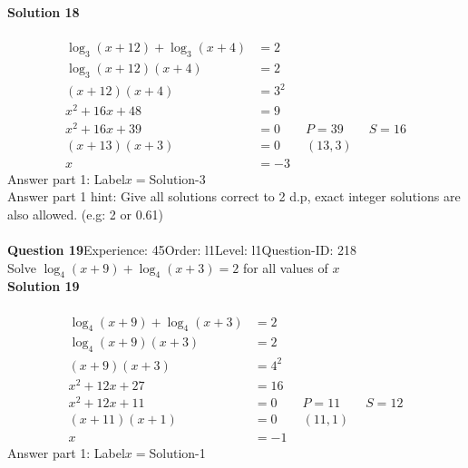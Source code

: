\documentclass{article}
\begin{document}
\noindent\textbf{Solution 18}\\[2pt]
\\[-35pt]\begin{align*}
\log_{3}(x+12)+\log_{3}(x+4)&=2\\[2pt]
\log_{3}(x+12)(x+4)&=2\\[2pt]
(x+12)(x+4)&=3^2\\[2pt]
x^2+16x+48&=9\\[2pt]
x^2+16x+39&=0\qquad P=39 \qquad S=16\\[2pt]
(x+13)(x+3)&=0\qquad (13,3)\\[2pt]
x&=-3
\end{align*}
Answer part 1: \hspace{10pt}Label\hspace{10pt}$x=$\hspace{10pt}Solution\hspace{10pt}-3\\
Answer part 1 hint: \hspace{15pt} Give all solutions correct to 2 d.p, exact integer solutions are also allowed. (e.g: 2 or 0.61)\\
\\[4pt]
\noindent\textbf{Question 19}\hspace{20pt}Experience: 45\hspace{20pt}Order: l1\hspace{20pt}Level: l1\hspace{20pt}Question-ID: 218\\[2pt]
Solve $\log_{4}(x+9)+\log_{4}(x+3)=2$ for all values of $x$\\[4pt]
\noindent\textbf{Solution 19}\\[2pt]
\\[-35pt]\begin{align*}
\log_{4}(x+9)+\log_{4}(x+3)&=2\\[2pt]
\log_{4}(x+9)(x+3)&=2\\[2pt]
(x+9)(x+3)&=4^2\\[2pt]
x^2+12x+27&=16\\[2pt]
x^2+12x+11&=0\qquad P=11 \qquad S=12\\[2pt]
(x+11)(x+1)&=0\qquad (11,1)\\[2pt]
x&=-1
\end{align*}
Answer part 1: \hspace{10pt}Label\hspace{10pt}$x=$\hspace{10pt}Solution\hspace{10pt}-1\\
\end{document}
